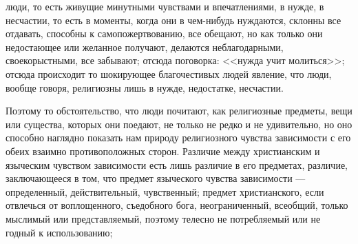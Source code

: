 \documentclass[12pt]{article}
\begin{document}
люди, то есть живущие минутными чувствами и впечатлениями, в нужде, в несчастии, то есть в моменты, когда они в чем-нибудь нуждаются, склонны все отдавать, способны к самопожертвованию, все обещают, но как только они недостающее или желанное получают, делаются неблагодарными, своекорыстными, все забывают; отсюда поговорка: <<нужда учит молиться>>; отсюда происходит то шокирующее благочестивых людей явление, что люди, вообще говоря, религиозны лишь в нужде, недостатке, несчастии. 

Поэтому то обстоятельство, что люди почитают, как религиозные предметы, вещи или существа, которых они поедают, не только не редко и не удивительно, но оно способно наглядно показать нам природу религиозного чувства зависимости с его обеих взаимно противоположных сторон. Различие между христианским и языческим чувством зависимости есть лишь различие в его предметах, различие, заключающееся в том, что предмет языческого чувства зависимости --- определенный, действительный, чувственный; предмет христианского, если отвлечься от воплощенного, съедобного бога, неограниченный, всеобщий, только мыслимый или представляемый, поэтому телесно не потребляемый или не годный к использованию; 
\end{document}
